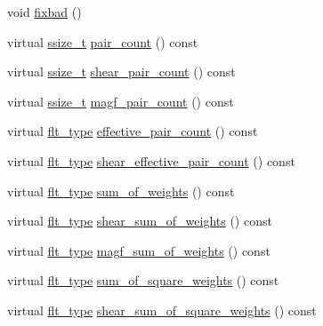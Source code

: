 \begin{DoxyCompactItemize}
\item 
void \hyperlink{classIceBRG_1_1pair__bin__summary_acdfe1a76073341dc7126367f8af9a92c}{fixbad} ()
\item 
virtual \hyperlink{lib_2IceBRG__main_2common_8h_ab322a3e50421dc5f0c43316b1b373592}{ssize\+\_\+t} \hyperlink{classIceBRG_1_1pair__bin__summary_a7890320b7873410727ffa9103cac4ddf}{pair\+\_\+count} () const 
\item 
virtual \hyperlink{lib_2IceBRG__main_2common_8h_ab322a3e50421dc5f0c43316b1b373592}{ssize\+\_\+t} \hyperlink{classIceBRG_1_1pair__bin__summary_a1907d19d230646152b52771046e9bca2}{shear\+\_\+pair\+\_\+count} () const 
\item 
virtual \hyperlink{lib_2IceBRG__main_2common_8h_ab322a3e50421dc5f0c43316b1b373592}{ssize\+\_\+t} \hyperlink{classIceBRG_1_1pair__bin__summary_aa411302e054c1ab2dc55f877efef03a9}{magf\+\_\+pair\+\_\+count} () const 
\item 
virtual \hyperlink{lib_2IceBRG__main_2common_8h_ad0f130a56eeb944d9ef2692ee881ecc4}{flt\+\_\+type} \hyperlink{classIceBRG_1_1pair__bin__summary_a66f311e593f9406545ccaf92c60af40d}{effective\+\_\+pair\+\_\+count} () const 
\item 
virtual \hyperlink{lib_2IceBRG__main_2common_8h_ad0f130a56eeb944d9ef2692ee881ecc4}{flt\+\_\+type} \hyperlink{classIceBRG_1_1pair__bin__summary_a63e24b9c233f7b9bc25417d7f4c3e31a}{shear\+\_\+effective\+\_\+pair\+\_\+count} () const 
\item 
virtual \hyperlink{lib_2IceBRG__main_2common_8h_ad0f130a56eeb944d9ef2692ee881ecc4}{flt\+\_\+type} \hyperlink{classIceBRG_1_1pair__bin__summary_ac7de7ef519ebec709aa75e49540060b8}{sum\+\_\+of\+\_\+weights} () const 
\item 
virtual \hyperlink{lib_2IceBRG__main_2common_8h_ad0f130a56eeb944d9ef2692ee881ecc4}{flt\+\_\+type} \hyperlink{classIceBRG_1_1pair__bin__summary_a9a891e623485e183eafdbb911e751b2b}{shear\+\_\+sum\+\_\+of\+\_\+weights} () const 
\item 
virtual \hyperlink{lib_2IceBRG__main_2common_8h_ad0f130a56eeb944d9ef2692ee881ecc4}{flt\+\_\+type} \hyperlink{classIceBRG_1_1pair__bin__summary_a9333a3ae54e73148957179aa2b18a3a7}{magf\+\_\+sum\+\_\+of\+\_\+weights} () const 
\item 
virtual \hyperlink{lib_2IceBRG__main_2common_8h_ad0f130a56eeb944d9ef2692ee881ecc4}{flt\+\_\+type} \hyperlink{classIceBRG_1_1pair__bin__summary_a423dac74001c5a426b4e626ca6615cb4}{sum\+\_\+of\+\_\+square\+\_\+weights} () const 
\item 
virtual \hyperlink{lib_2IceBRG__main_2common_8h_ad0f130a56eeb944d9ef2692ee881ecc4}{flt\+\_\+type} \hyperlink{classIceBRG_1_1pair__bin__summary_a63dd09417aa6bb32da1898e8baa0b306}{shear\+\_\+sum\+\_\+of\+\_\+square\+\_\+weights} () const 

\end{DoxyCompactItemize}
